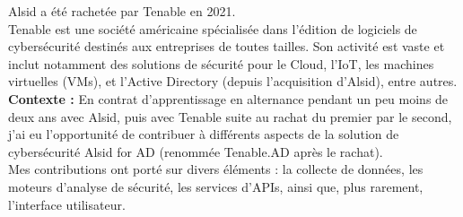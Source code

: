 \documentclass[8pt]{developercv} %
\begin{document}
Alsid a été rachetée par Tenable en 2021.\\

Tenable est une société américaine spécialisée dans l'édition de logiciels de cybersécurité destinés aux entreprises de toutes tailles. Son activité est vaste et inclut notamment des solutions de sécurité pour le Cloud, l'IoT, les machines virtuelles (VMs), et l'Active Directory (depuis l'acquisition d'Alsid), entre autres.\\

\textbf{Contexte :} En contrat d'apprentissage en alternance pendant un peu moins de deux ans avec Alsid, puis avec Tenable suite au rachat du premier par le second, j'ai eu l'opportunité de contribuer à différents aspects de la solution de cybersécurité Alsid for AD (renommée Tenable.AD après le rachat).\\

Mes contributions ont porté sur divers éléments : la collecte de données, les moteurs d'analyse de sécurité, les services d'APIs, ainsi que, plus rarement, l'interface utilisateur.\\
\end{document}
